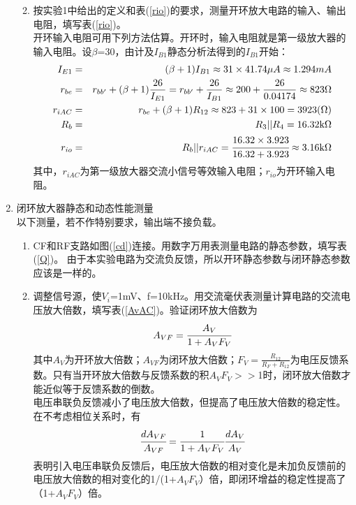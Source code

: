 \documentclass[a4paper]{article}
\begin{document}
\begin{enumerate}
\begin{enumerate}
\begin{table}[!h]
\begin{tabular}{|c|c|c|c|c|c|c|c|}
\end{tabular}
\end{table}
\item 按实验1中给出的定义和表(\ref{rio})的要求，测量开环放大电路的输入、输出电阻，填写表(\ref{rio})。\\
开环输入电阻可用下列方法估算。开环时，输入电阻就是第一级放大器的输入电阻。设$\beta$=30，由计及$I_{B1}$静态分析法得到的$I_{B1}$开始：
\begin{eqnarray}
I_{E1} &=& (\beta+1)I_{B1}\approx 31\times 41.74\mu A\approx 1.294 mA\\
r_{be} &=& r_{bb'}+(\beta+1)\frac{26}{I_{E1}} = r_{bb'}+\frac{26}{I_{B1}} \approx 200+\frac{26}{0.04174}\approx 823\Omega\\
r_{iAC} &=& r_{be}+(\beta+1)R_{12} \approx 823+31\times 100 = 3923(\Omega)\\\label{2-6}
R_b &=& R_3||R_4 = 16.32\text{k}\Omega\\
r_{io} &=& R_b||r_{iAC} = \cfrac{16.32\times 3.923}{16.32+3.923} \approx 3.16\text{k}\Omega
\end{eqnarray}
其中，$r_{iAC}$为第一级放大器交流小信号等效输入电阻；$r_{io}$为开环输入电阻。
\end{enumerate}
\item 闭环放大器静态和动态性能测量\\
以下测量，若不作特别要求，输出端不接负载。
\begin{enumerate}
\item CF和RF支路如图(\ref{cd})连接。用数字万用表测量电路的静态参数，填写表(\ref{Q})。
由于本实验电路为交流负反馈，所以开环静态参数与闭环静态参数应该是一样的。
\item 调整信号源，使$V_i$=1mV、f=10kHz。用交流毫伏表测量计算电路的交流电压放大倍数，填写表(\ref{AvAC})。验证闭环放大倍数为
\begin{equation}
A_{VF} = \cfrac{A_V}{1+A_VF_V}
\end{equation}
其中$A_V$为开环放大倍数；$A_{VF}$为闭环放大倍数；$F_V = \frac{R_{12}}{R_F+R_{12}}$为电压反馈系数。只有当开环放大倍数与反馈系数的积$A_VF_V>>$1时，闭环放大倍数才能近似等于反馈系数的倒数。\\
电压串联负反馈减小了电压放大倍数，但提高了电压放大倍数的稳定性。在不考虑相位关系时，有
\begin{equation}
\cfrac{dA_{VF}}{A_{VF}} = \cfrac{1}{1+A_VF_V}\cfrac{dA_V}{A_V}
\end{equation}
表明引入电压串联负反馈后，电压放大倍数的相对变化是未加负反馈前的电压放大倍数的相对变化的1/(1+$A_VF_V$）倍，即闭环增益的稳定性提高了（1+$A_VF_V$）倍。

\end{enumerate}
\end{enumerate}
\end{document}
